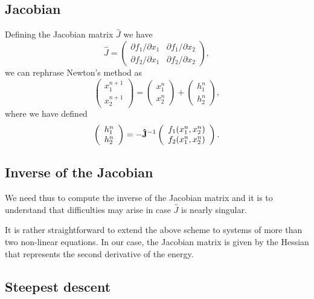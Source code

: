 \documentclass[%
oneside,                 %
final,                   %
10pt]{article}
\begin{document}
\subsection{Jacobian}
Defining the Jacobian matrix $\hat{J}$ we have
\[
 \hat{J}=\left( \begin{array}{cc}
                         \partial f_1/\partial x_1  & \partial f_1/\partial x_2 \\
                          \partial f_2/\partial x_1     &\partial f_2/\partial x_2
             \end{array} \right),
\]
we can rephrase Newton's method as
\[
\left(\begin{array}{c} x_1^{n+1} \\ x_2^{n+1} \end{array} \right)=
\left(\begin{array}{c} x_1^{n} \\ x_2^{n} \end{array} \right)+
\left(\begin{array}{c} h_1^{n} \\ h_2^{n} \end{array} \right),
\]
where we have defined
\[
   \left(\begin{array}{c} h_1^{n} \\ h_2^{n} \end{array} \right)=
   -{\bf \hat{J}}^{-1}
   \left(\begin{array}{c} f_1(x_1^{n},x_2^{n}) \\ f_2(x_1^{n},x_2^{n}) \end{array} \right).
\]

\subsection{Inverse of the Jacobian}

We need thus to compute the inverse of the Jacobian matrix and it
is to understand that difficulties  may
arise in case $\hat{J}$ is nearly singular.

It is rather straightforward to extend the above scheme to systems of
more than two non-linear equations. In our case, the Jacobian matrix is given by the Hessian that represents the second derivative of the energy.

\subsection{Steepest descent}
\end{document}
